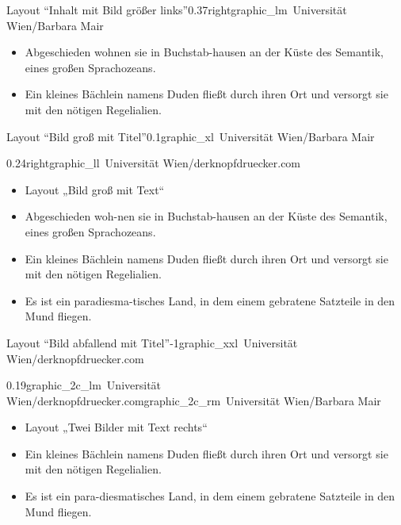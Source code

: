 \documentclass[hyperref={pdfpagelabels=false}, aspectratio=43, t]{beamer}  %
\begin{document}
\begin{graphicsFrame}{Layout ``Inhalt mit Bild größer links''}{}{0.37}{right}{graphic_lm}{\textcopyright~Universität Wien/Barbara Mair}

		\begin{itemize}
			\item Abgeschieden wohnen sie in Buchstab-hausen an der Küste des Semantik, eines großen Sprachozeans.
			\item Ein kleines Bächlein namens Duden fließt durch ihren Ort und versorgt sie mit den nötigen Regelialien.
		\end{itemize}

\end{graphicsFrame}

\begin{graphicsFrame}{Layout ``Bild groß mit Titel''}{}{0.1}{}{graphic_xl}{\textcopyright~Universität Wien/Barbara Mair}

\end{graphicsFrame}

\begin{graphicsFrame}{}{}{0.24}{right}{graphic_ll}{\textcopyright~Universität Wien/derknopfdruecker.com}

		\begin{itemize}
			\item Layout „Bild groß mit Text“ 
			\item Abgeschieden woh-nen sie in Buchstab-hausen an der Küste des Semantik, eines großen Sprachozeans.
			\item Ein kleines Bächlein namens Duden fließt durch ihren Ort und versorgt sie mit den nötigen Regelialien.
			\item Es ist ein paradiesma-tisches Land, in dem einem gebratene Satzteile in den Mund fliegen.
		\end{itemize}

\end{graphicsFrame}

\begin{graphicsFrame}{Layout ``Bild abfallend mit Titel''}{}{-1}{}{graphic_xxl}{\textcopyright~Universität Wien/derknopfdruecker.com}

\end{graphicsFrame}

\begin{graphicsFrame2}{}{0.19}{graphic_2c_lm}{\textcopyright~Universität Wien/derknopfdruecker.com}{graphic_2c_rm}{\textcopyright~Universität Wien/Barbara Mair}

		\begin{itemize}
			\item Layout „Twei Bilder mit Text rechts“ 
			\item Ein kleines Bächlein namens Duden fließt durch ihren Ort und versorgt sie mit den nötigen Regelialien.
			\item Es ist ein para-diesmatisches Land, in dem einem gebratene Satzteile in den Mund fliegen.
		\end{itemize}

\end{graphicsFrame2}
\end{document}
